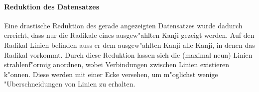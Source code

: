 \paragraph{Reduktion des Datensatzes}
Eine drastische Reduktion des gerade angezeigten Datensatzes wurde dadurch erreicht, dass nur die Radikale eines ausgew"ahlten Kanji gezeigt werden. Auf den Radikal-Linien befinden auss er dem ausgew"ahlten Kanji alle Kanji, in denen das Radikal vorkommt. Durch diese Reduktion lassen sich die (maximal neun) Linien strahlenf"ormig anordnen, wobei Verbindungen zwischen Linien existieren k"onnen. Diese werden mit einer Ecke versehen, um m"oglichst wenige "Uberschneidungen von Linien zu erhalten. 

